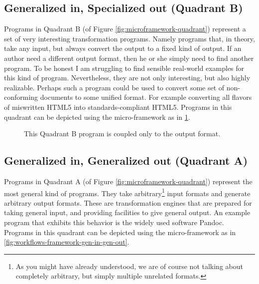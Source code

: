 \documentclass{scrreprt}
\begin{document}
\subsection{Generalized in, Specialized out (Quadrant B)}
Programs in Quadrant B (of Figure \ref{fig:microframework-quadrant}) represent a set of very interesting transformation programs. Namely programs that, in theory, take any input, but always convert the output to a fixed kind of output. If an author need a different output format, then he or she simply need to find another program. To be honest I am struggling to find sensible real-world examples for this kind of program. Nevertheless, they are not only interesting, but also highly realizable. Perhaps such a program could be used to convert some set of non-conforming documents to some unified format. For example converting all flavors of miswritten HTML5 into standards-compliant HTML5. Programs in this quadrant can be depicted using the micro-framework as in \ref{fig:workflows-framework-gen-in-spec-out}.

\begin{figure}[p]
  \centering


  \caption{This Quadrant B program is coupled only to the output format.}
  \label{fig:workflows-framework-gen-in-spec-out}
\end{figure}




\subsection{Generalized in, Generalized out (Quadrant A)}
Programs in Quadrant A (of Figure \ref{fig:microframework-quadrant}) represent the most general kind of programs. They take arbitrary\footnote{As you might have already understood, we are of course not talking about completely arbitrary, but simply multiple unrelated formats.} input formats and generate arbitrary output formats. These are transformation engines that are prepared for taking general input, and providing facilities to give general output. An example program that exhibits this behavior is the widely used software Pandoc.  Programs in this quadrant can be depicted using the micro-framework as in \ref{fig:workflows-framework-gen-in-gen-out}.
\end{document}
